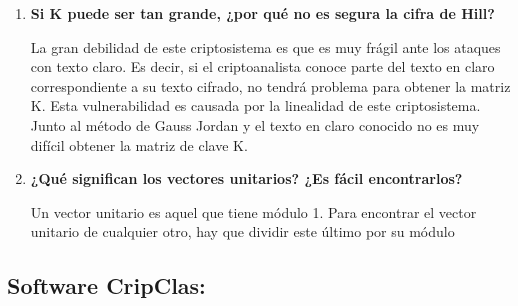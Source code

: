 \documentclass{article}
\begin{document}
\begin{enumerate}
    Otra máquina que usaban para cifrar los alemanes era la Lorenz SZ y la SZ 42. La máquina de Lorenz fue usada para comunicaciones de alto nivel. Las máquinas teletipo generaban cada carácter como cinco bits paralelos en cinco líneas, comúnmente cifradas en Código Baudot o alguno similar. La máquina de Lorenz emitía grupos de cinco bits pseudoaleatorios para ser XOReados con Texto Plano. Los bits pseudoaleatorios eran generados por diez rodillos de pines, cinco de los cuales pasaban regularmente, rodillos identificados con el símbolo $\chi$, y cinco de los cuales pasaban irregularmente, rodillos identificados con el símbolo $\psi$. El paso de los rodillos $\psi$ era determinado por dos o más rodillos de pines, llamados "rodillos motor". Además del paso de los cinco rodillos irregulares (que permanecían juntos), la máquina de Lorenz era en realidad un generador de cinco pseudoaleatorios en paralelo; no hay otra interacción entre las cinco líneas. El número de pines en todos los rodillos era primo relativo.  
    
    \item \textbf{Si K puede ser tan grande, ¿por qué no es segura la cifra de Hill?}
    
    La gran debilidad de este criptosistema es que es muy frágil ante los ataques con texto claro. Es decir, si el criptoanalista conoce parte del texto en claro correspondiente a su texto cifrado, no tendrá problema para obtener la matriz K. Esta vulnerabilidad es causada por la linealidad de este criptosistema. Junto al método de Gauss Jordan y el texto en claro conocido no es muy difícil obtener la matriz de clave K. 
    
    
    \item \textbf{¿Qué significan los vectores unitarios? ¿Es fácil encontrarlos?}
    
    Un vector unitario es aquel que tiene módulo 1. Para encontrar el vector unitario de cualquier otro, hay que dividir este último por su módulo 
    

    
    
    
\end{enumerate}
\newpage
\subsection{Software CripClas:}
\end{document}
